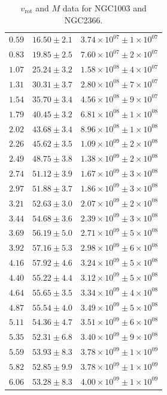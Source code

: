 \documentclass{article}
\newcommand\vrot{\ensuremath{v_{\textrm{rot}}}}
\begin{document}
\begin{table}[h!]
\begin{tabular}{|c|c|c|}
        $0.59$ & $16.50 \pm 2.1$ & $3.74\times 10^{07} \pm 1\times 10^{07}$ \\
        $0.83$ & $19.85 \pm 2.5$ & $7.60\times 10^{07} \pm 2\times 10^{07}$ \\
        $1.07$ & $25.24 \pm 3.2$ & $1.58\times 10^{08} \pm 4\times 10^{07}$ \\
        $1.31$ & $30.31 \pm 3.7$ & $2.80\times 10^{08} \pm 7\times 10^{07}$ \\
        $1.54$ & $35.70 \pm 3.4$ & $4.56\times 10^{08} \pm 9\times 10^{07}$ \\
        $1.79$ & $40.45 \pm 3.2$ & $6.81\times 10^{08} \pm 1\times 10^{08}$ \\
        $2.02$ & $43.68 \pm 3.4$ & $8.96\times 10^{08} \pm 1\times 10^{08}$ \\
        $2.26$ & $45.62 \pm 3.5$ & $1.09\times 10^{09} \pm 2\times 10^{08}$ \\
        $2.49$ & $48.75 \pm 3.8$ & $1.38\times 10^{09} \pm 2\times 10^{08}$ \\
        $2.74$ & $51.12 \pm 3.9$ & $1.67\times 10^{09} \pm 3\times 10^{08}$ \\
        $2.97$ & $51.88 \pm 3.7$ & $1.86\times 10^{09} \pm 3\times 10^{08}$ \\
        $3.21$ & $52.63 \pm 3.0$ & $2.07\times 10^{09} \pm 2\times 10^{08}$ \\
        $3.44$ & $54.68 \pm 3.6$ & $2.39\times 10^{09} \pm 3\times 10^{08}$ \\
        $3.69$ & $56.19 \pm 5.0$ & $2.71\times 10^{09} \pm 5\times 10^{08}$ \\
        $3.92$ & $57.16 \pm 5.3$ & $2.98\times 10^{09} \pm 6\times 10^{08}$ \\
        $4.16$ & $57.92 \pm 4.6$ & $3.24\times 10^{09} \pm 5\times 10^{08}$ \\
        $4.40$ & $55.22 \pm 4.4$ & $3.12\times 10^{09} \pm 5\times 10^{08}$ \\
        $4.64$ & $55.65 \pm 3.5$ & $3.34\times 10^{09} \pm 4\times 10^{08}$ \\
        $4.87$ & $55.54 \pm 4.0$ & $3.49\times 10^{09} \pm 5\times 10^{08}$ \\
        $5.11$ & $54.36 \pm 4.7$ & $3.51\times 10^{09} \pm 6\times 10^{08}$ \\
        $5.35$ & $52.31 \pm 6.8$ & $3.40\times 10^{09} \pm 9\times 10^{08}$ \\
        $5.59$ & $53.93 \pm 8.3$ & $3.78\times 10^{09} \pm 1\times 10^{09}$ \\
        $5.82$ & $52.85 \pm 9.9$ & $3.78\times 10^{09} \pm 1\times 10^{09}$ \\
        $6.06$ & $53.28 \pm 8.3$ & $4.00\times 10^{09} \pm 1\times 10^{09}$ \\
        \hline
    \end{tabular}
    \caption{$\vrot$ and $M$ data for NGC1003 and NGC2366.}
    \label{tab:proc1003-2366}
\end{table}
\doublespacing
\end{document}
